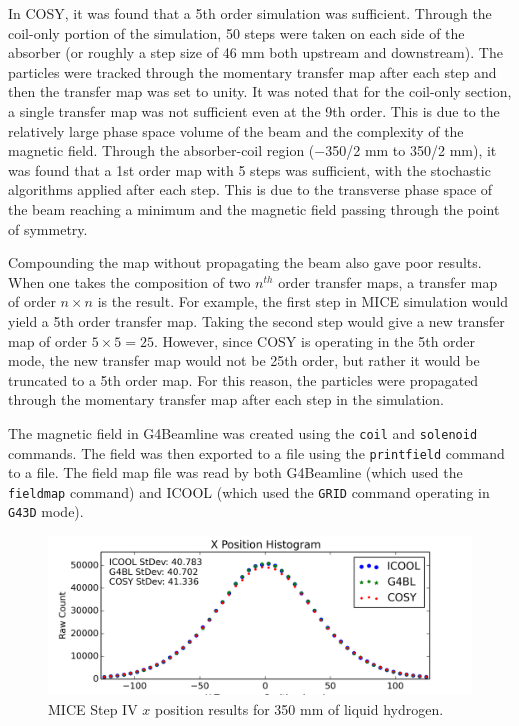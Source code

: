 \documentclass[a4paper,11pt]{article}
\begin{document}
In COSY, it was found that a 5th order simulation was sufficient. Through the coil-only portion of the simulation, 50 steps were taken on each side of the absorber (or roughly a step size of 46 mm both upstream and downstream). The particles were tracked through the momentary transfer map after each step and then the transfer map was set to unity. It was noted that for the coil-only section, a single transfer map was not sufficient even at the 9th order. This is due to the relatively large phase space volume of the beam and the complexity of the magnetic field. Through the absorber-coil region ($-$350/2 mm to 350/2 mm), it was found that a 1st order map with 5 steps was sufficient, with the stochastic algorithms applied after each step. This is due to the transverse phase space of the beam reaching a minimum and the magnetic field passing through the point of symmetry.

Compounding the map without propagating the beam also gave poor results. When one takes the composition of two $n^{th}$ order transfer maps, a transfer map of order $n\times n$ is the result. For example, the first step in MICE simulation would yield a 5th order transfer map. Taking the second step would give a new transfer map of order $5\times 5 = 25$. However, since COSY is operating in the 5th order mode, the new transfer map would not be 25th order, but rather it would be truncated to a 5th order map. For this reason, the particles were propagated through the momentary transfer map after each step in the simulation.

The magnetic field in G4Beamline was created using the \texttt{coil} and \texttt{solenoid} commands. The field was then exported to a file using the \texttt{printfield} command to a file. The field map file was read by both G4Beamline (which used the \texttt{fieldmap} command) and ICOOL (which used the \texttt{GRID} command operating in \texttt{G43D} mode).

\iffalse
\begin{figure}[htb]
  \centering
    \includegraphics[width=\columnwidth]{Figures/x} 
  \caption{MICE Step IV $x$ position results for 350 mm of liquid hydrogen.}
  \label{fig:micex}
\end{figure}
\end{document}
